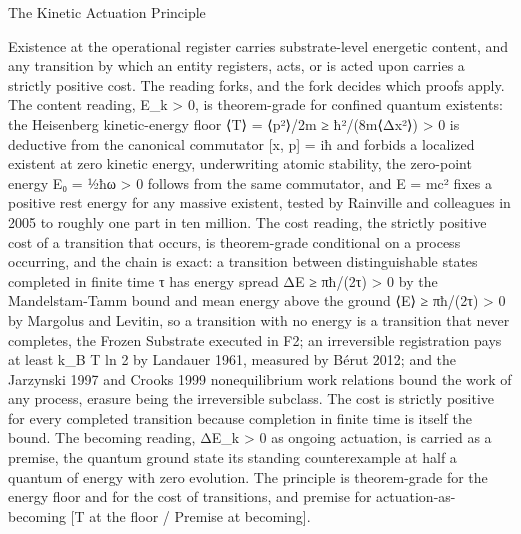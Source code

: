 \documentclass[10pt,twocolumn]{article}
\begin{document}
\begin{jbox}{The Kinetic Actuation Principle}

Existence at the operational register carries substrate-level energetic
content, and any transition by which an entity registers, acts, or is
acted upon carries a strictly positive cost. The reading forks, and the
fork decides which proofs apply. The content reading, E\_k
\textgreater{} 0, is theorem-grade for confined quantum existents: the
Heisenberg kinetic-energy floor ⟨T⟩ = ⟨p²⟩/2m ≥ ħ²/(8m⟨Δx²⟩)
\textgreater{} 0 is deductive from the canonical commutator {[}x, p{]} =
iħ and forbids a localized existent at zero kinetic energy, underwriting
atomic stability, the zero-point energy E₀ = ½ħω \textgreater{} 0
follows from the same commutator, and E = mc² fixes a positive rest
energy for any massive existent, tested by Rainville and colleagues in
2005 to roughly one part in ten million. The cost reading, the strictly
positive cost of a transition that occurs, is theorem-grade conditional
on a process occurring, and the chain is exact: a transition between
distinguishable states completed in finite time τ has energy spread ΔE ≥
πħ/(2τ) \textgreater{} 0 by the Mandelstam-Tamm bound and mean energy
above the ground ⟨E⟩ ≥ πħ/(2τ) \textgreater{} 0 by Margolus and Levitin,
so a transition with no energy is a transition that never completes, the
Frozen Substrate executed in F2; an irreversible registration pays at
least k\_B T ln 2 by Landauer 1961, measured by Bérut 2012; and the
Jarzynski 1997 and Crooks 1999 nonequilibrium work relations bound the
work of any process, erasure being the irreversible subclass. The cost
is strictly positive for every completed transition because completion
in finite time is itself the bound. The becoming reading, ΔE\_k
\textgreater{} 0 as ongoing actuation, is carried as a premise, the
quantum ground state its standing counterexample at half a quantum of
energy with zero evolution. The principle is theorem-grade for the
energy floor and for the cost of transitions, and premise for
actuation-as-becoming {[}T at the floor / Premise at becoming{]}.

\end{jbox}
\end{document}
